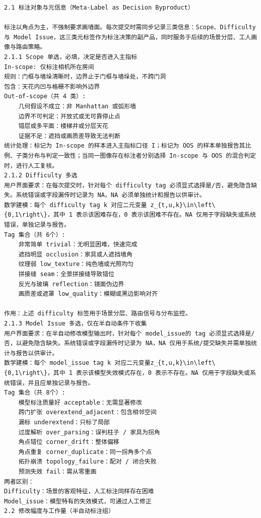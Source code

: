 \documentclass[a4paper,12pt]{article}
\begin{document}
\begin{Verbatim}[fontsize=\small,breaklines=true,breakanywhere=true]
2.1 标注对象与元信息（Meta-Label as Decision Byproduct）

标注以角点为主，不强制要求画墙面。每次提交时需同步记录三类信息：Scope、Difficulty 与 Model Issue，这三类元标签作为标注决策的副产品，同时服务于后续的场景分层、工人画像与路由策略。
2.1.1 Scope 单选，必填，决定是否进入主指标
In-scope: 仅标注相机所在房间
规则：门框与墙垛清晰时，边界止于门框与墙垛处，不跨门洞
包含：天花内凹与格栅不影响外边界
Out-of-scope（共 4 类）:
	几何假设不成立：非 Manhattan 或弧形墙
	边界不可判定：开放式或无可靠停止点
	错层或多平面：楼梯井或分层天花
	证据不足：遮挡或画质差导致无法判断
统计处理：标记为 In-scope 的样本进入主指标口径 I；标记为 OOS 的样本单独报告其比例、子类分布与判定一致性；当同一图像存在标注者分别选择 In-scope 与 OOS 的混合判定时，进行人工复核。
2.1.2 Difficulty 多选
用户界面要求：在每次提交时，针对每个 difficulty tag 必须显式选择是/否，避免隐含缺失。系统错误或字段漏传时记录为 NA，NA 必须单独统计和报告以供审计。
数学建模：每个 difficulty tag k 对应二元变量 z_{t,u,k}\in\left\{0,1\right\}，其中 1 表示该困难存在，0 表示该困难不存在。NA 仅用于字段缺失或系统错误，单独记录与报告。
Tag 集合（共 6个）:
	非常简单 trivial：无明显困难，快速完成
	遮挡明显 occlusion：家具或人遮挡墙角
	纹理弱 low_texture：纯色墙或光照均匀
	拼接缝 seam：全景拼接缝导致错位
	反光与玻璃 reflection：镜面伪边界
	画质差或遮罩 low_quality：模糊或黑边影响对齐

作用：上述 difficulty 标签用于场景分层、路由信号与分布监控。
2.1.3 Model Issue 多选，仅在半自动条件下收集
用户界面要求：在半自动修改模型输出时，针对每个 model_issue的 tag 必须显式选择是/否，以避免隐含缺失。系统错误或字段漏传时记录为 NA，NA 仅用于系统/提交缺失并需单独统计与报告以供审计。
数学建模：每个 model_issue tag k 对应二元变量z_{t,u,k}\in\left\{0,1\right\}，其中 1 表示该模型失效模式存在，0 表示不存在。NA 仅用于字段缺失或系统错误，并且应单独记录与报告。
Tag 集合（共 8个）:
	模型标注质量好 acceptable：无需显著修改
	跨门扩张 overextend_adjacent：包含相邻空间
	漏标 underextend：只标了局部
	过度解析 over_parsing：误判柱子 / 家具为拐角
	角点错位 corner_drift：整体偏移
	角点重复 corner_duplicate：同一拐角多个点
	拓扑崩溃 topology_failure：配对 / 闭合失败
	预测失效 fail：需从零重画
两者区别：
Difficulty：场景的客观特征，人工标注同样存在困难
Model_issue：模型特有的失效模式，可通过人工修正
2.2 修改幅度与工作量（半自动标注组）


\end{Verbatim}
\end{document}
